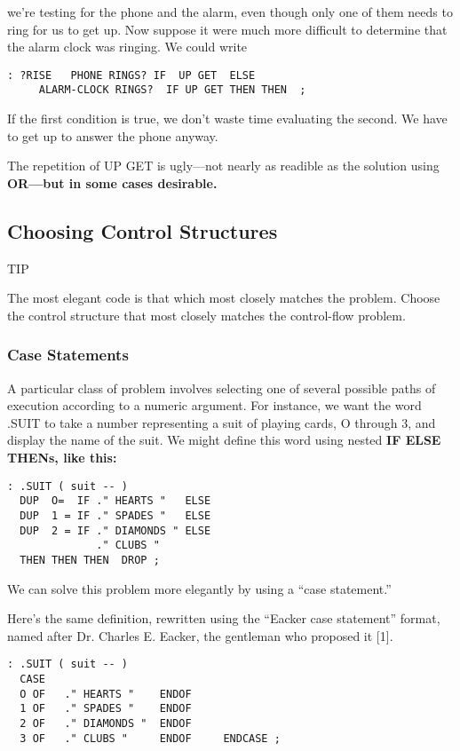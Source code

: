 we're testing for the phone and the alarm, even though only one of them
needs to ring for us to get up. Now suppose it were much more difficult to
determine that the alarm clock was ringing. We could write

\begin{verbatim}
: ?RISE   PHONE RINGS? IF  UP GET  ELSE
     ALARM-CLOCK RINGS?  IF UP GET THEN THEN  ;
\end{verbatim}

If the first condition is true, we don't waste time evaluating the second.
We have to get up to answer the phone anyway.

The repetition of UP GET is ugly---not nearly as readible as the
solution using \bf{OR}---but in some cases desirable.

\subsection{Choosing Control Structures}

TIP

The most elegant code is that which most closely matches the problem.
Choose the control structure that most closely matches the control-flow
problem.

\subsubsection{Case Statements}

A particular class of problem involves selecting one of several possible
paths of execution according to a numeric argument. For instance, we
want the word .SUIT to take a number representing a suit of playing
cards, O through 3, and display the name of the suit. We might define this
word using nested \bf{IF ELSE THEN}s, like this:

\begin{verbatim}
: .SUIT ( suit -- )
  DUP  O=  IF ." HEARTS "   ELSE
  DUP  1 = IF ." SPADES "   ELSE
  DUP  2 = IF ." DIAMONDS " ELSE
              ." CLUBS "
  THEN THEN THEN  DROP ;
\end{verbatim}

We can solve this problem more elegantly by using a ``case statement.''

Here's the same definition, rewritten using the ``Eacker case statement''
format, named after Dr. Charles E. Eacker, the gentleman who proposed
it [1].

\begin{verbatim}
: .SUIT ( suit -- )
  CASE
  O OF   ." HEARTS "    ENDOF
  1 OF   ." SPADES "    ENDOF
  2 OF   ." DIAMONDS "  ENDOF
  3 OF   ." CLUBS "     ENDOF     ENDCASE ;
\end{verbatim}

